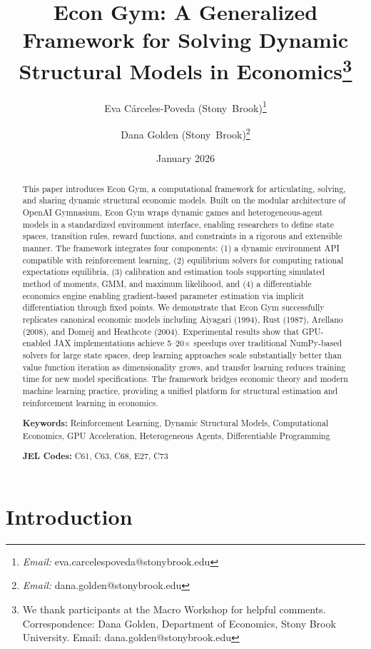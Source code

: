 \documentclass[12pt]{article}
\title{\textbf{Econ Gym: A Generalized Framework for Solving Dynamic Structural Models in Economics}\thanks{We thank participants at the Macro Workshop for helpful comments. Correspondence: Dana Golden, Department of Economics, Stony Brook University. Email: dana.golden@stonybrook.edu}}
\author{Eva C\'{a}rceles-Poveda (Stony\
Brook)\thanks{\textit{Email:} eva.carcelespoveda@stonybrook.edu} \and Dana
Golden (Stony\ Brook)\thanks{\textit{Email:} dana.golden@stonybrook.edu}\\}
\date{January 2026}
\begin{document}
\maketitle

\begin{abstract}
\noindent This paper introduces Econ Gym, a computational framework for articulating, solving, and sharing dynamic structural economic models. Built on the modular architecture of OpenAI Gymnasium, Econ Gym wraps dynamic games and heterogeneous-agent models in a standardized environment interface, enabling researchers to define state spaces, transition rules, reward functions, and constraints in a rigorous and extensible manner. The framework integrates four components: (1) a dynamic environment API compatible with reinforcement learning, (2) equilibrium solvers for computing rational expectations equilibria, (3) calibration and estimation tools supporting simulated method of moments, GMM, and maximum likelihood, and (4) a differentiable economics engine enabling gradient-based parameter estimation via implicit differentiation through fixed points. We demonstrate that Econ Gym successfully replicates canonical economic models including Aiyagari (1994), Rust (1987), Arellano (2008), and Domeij and Heathcote (2004). Experimental results show that GPU-enabled JAX implementations achieve 5--20$\times$ speedups over traditional NumPy-based solvers for large state spaces, deep learning approaches scale substantially better than value function iteration as dimensionality grows, and transfer learning reduces training time for new model specifications. The framework bridges economic theory and modern machine learning practice, providing a unified platform for structural estimation and reinforcement learning in economics.

\bigskip
\noindent \textbf{Keywords:} Reinforcement Learning, Dynamic Structural Models, Computational Economics, GPU Acceleration, Heterogeneous Agents, Differentiable Programming

\bigskip
\noindent \textbf{JEL Codes:} C61, C63, C68, E27, C73
\end{abstract}

\newpage
\tableofcontents
\newpage

\section{Introduction}
\end{document}
